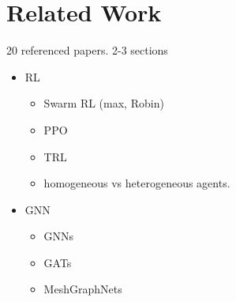 
\chapter{Related Work}
\label{ch:Related Work}

20 referenced papers. 2-3 sections
\begin{itemize}[noitemsep,nolistsep]
	\item RL
	\begin{itemize}[noitemsep,nolistsep]
        \item Swarm RL (max, Robin)
        \item PPO
        \item TRL
        \item homogeneous vs heterogeneous agents.
    \end{itemize}
    
	\item GNN
	\begin{itemize}[noitemsep,nolistsep]
        \item GNNs
        \item GATs
        \item MeshGraphNets
    \end{itemize}
\end{itemize}
